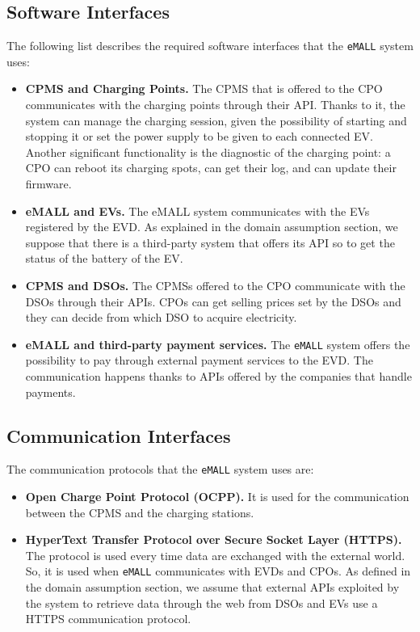 \subsection{Software Interfaces}
\label{subsec:software_interfaces}%
The following list describes the required software interfaces that the \verb|eMALL| system uses:
\begin{itemize}
    \item \textbf{CPMS and Charging Points.} The CPMS that is offered to the CPO communicates with the charging points
    through their API\@.
    Thanks to it, the system can manage the charging session, given the possibility of starting and stopping it or set
    the power supply to be given to each connected EV\@.
    Another significant functionality is the diagnostic of the charging point:
    a CPO can reboot its charging spots, can get their log, and can update their firmware.
    \item \textbf{eMALL and EVs.} The eMALL system communicates with the EVs registered by the EVD\@.
    As explained in the domain assumption section, we suppose that there is a third-party system that offers its API
    so to get the status of the battery of the EV\@.
    \item \textbf{CPMS and DSOs.} The CPMSs offered to the CPO communicate with the DSOs through their APIs.
    CPOs can get selling prices set by the DSOs and they can decide from which DSO to acquire electricity.
    \item \textbf{eMALL and third-party payment services.} The \verb|eMALL| system offers the possibility to pay through
    external payment services to the EVD. The communication happens thanks to APIs offered by the companies that handle payments.
\end{itemize}

\subsection{Communication Interfaces}
\label{subsec:communication_interfaces}%
The communication protocols that the \verb|eMALL| system uses are:
\begin{itemize}
    \item \textbf{Open Charge Point Protocol (OCPP).} It is used for the communication between the CPMS and the charging
    stations.
    \item \textbf{HyperText Transfer Protocol over Secure Socket Layer (HTTPS).} The protocol is used every time data are
    exchanged with the external world.
    So, it is used when \verb|eMALL| communicates with EVDs and CPOs.
    As defined in the domain assumption section, we assume that external APIs exploited by the system to retrieve data
    through the web from DSOs and EVs use a HTTPS communication protocol.
\end{itemize}


